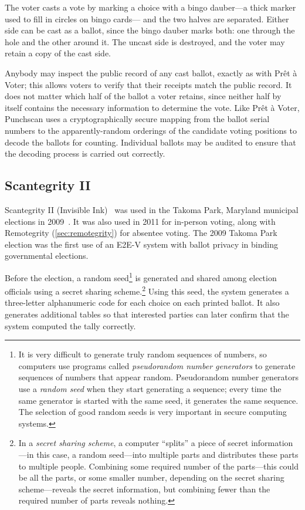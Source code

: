 The voter casts a vote by marking a choice with a bingo dauber---a
thick marker used to fill in circles on bingo cards--- and the two
halves are separated. Either side can be cast as a ballot, since the
bingo dauber marks both: one through the hole and the other around
it. The uncast side is destroyed, and the voter may retain a copy of
the cast side.

Anybody may inspect the public record of any cast ballot, exactly as
with Prêt à Voter; this allows voters to verify that their receipts
match the public record. It does not matter which half of the ballot a
voter retains, since neither half by itself contains the necessary
information to determine the vote. Like Prêt à Voter, Punchscan uses a
cryptographically secure mapping from the ballot serial numbers to the
apparently-random orderings of the candidate voting positions to
decode the ballots for counting. Individual ballots may be audited to
ensure that the decoding process is carried out correctly.

\subsection{Scantegrity II}
\label{sec:scantegrity-ii}

Scantegrity II (Invisible Ink)~\cite{chaum2008,chaum2009} was used in
the Takoma Park, Maryland municipal elections in
2009~\cite{carback2010}. It was also used in 2011 for in-person
voting, along with Remotegrity (\autoref{sec:remotegrity}) for
absentee voting. The 2009 Takoma Park election was the first use of an
E2E-V system with ballot privacy in binding governmental elections.

Before the election, a random seed\footnote{It is very difficult to
  generate truly random sequences of numbers, so computers use
  programs called \emph{pseudorandom number generators} to generate
  sequences of numbers that appear random. Pseudorandom number
  generators use a \emph{random seed} when they start generating a
  sequence; every time the same generator is started with the same
  seed, it generates the same sequence. The selection of good random
  seeds is very important in secure computing systems.}
is generated and shared among election officials using a secret
sharing scheme.\footnote{In a \emph{secret sharing scheme}, a computer
  ``splits'' a piece of secret information---in this case, a random
  seed---into multiple parts and distributes these parts to multiple
  people. Combining some required number of the parts---this could be
  all the parts, or some smaller number, depending on the secret
  sharing scheme---reveals the secret information, but combining fewer
  than the required number of parts reveals nothing.} Using this seed, the system generates
a three-letter alphanumeric code for each choice on each printed
ballot. It also generates additional tables so that interested parties
can later confirm that the system computed the tally correctly.


